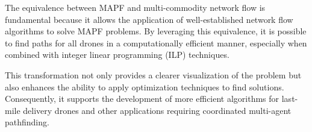The equivalence between MAPF and multi-commodity network flow is fundamental because it allows the application of well-established network flow algorithms to solve MAPF problems. By leveraging this equivalence, it is possible to find paths for all drones in a computationally efficient manner, especially when combined with integer linear programming (ILP) techniques.

This transformation not only provides a clearer visualization of the problem but also enhances the ability to apply optimization techniques to find solutions. Consequently, it supports the development of more efficient algorithms for last-mile delivery drones and other applications requiring coordinated multi-agent pathfinding.
